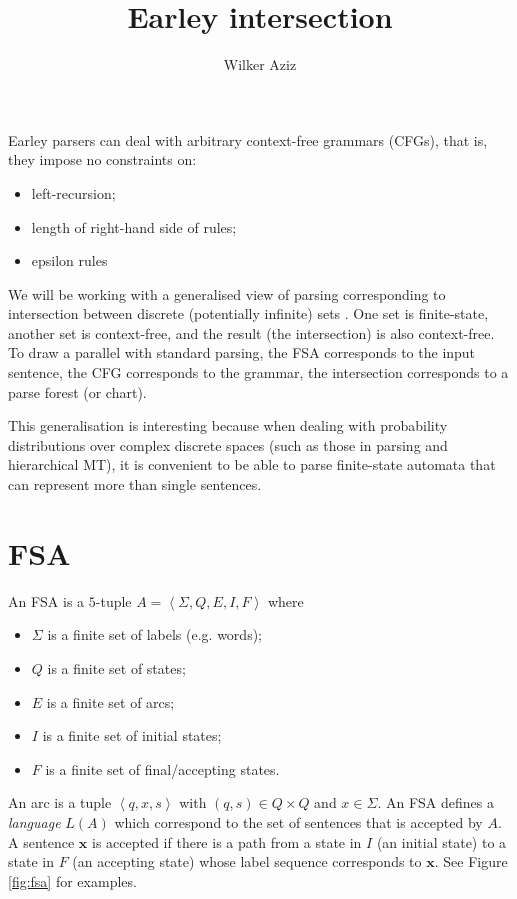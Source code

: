 \documentclass[11pt]{article}
\title{Earley intersection}
\author{Wilker Aziz}
\date{}
\newcommand{\angbrack}[1]{\ensuremath{\left\langle #1 \right\rangle}}
\begin{document}
\maketitle


Earley parsers \citep{Earley:1970} can deal with arbitrary context-free grammars (CFGs), that is, they impose no constraints on:
\begin{itemize}
	\item left-recursion;
	\item length of right-hand side of rules;
	\item epsilon rules
\end{itemize}

We will be working with a generalised view of parsing corresponding to intersection between discrete (potentially infinite) sets \citep{BarHillel+1961,Billott+1989}. One set is finite-state, another set is context-free, and the result (the intersection) is also context-free. 
To draw a parallel with standard parsing, the FSA corresponds to the input sentence, the CFG corresponds to the grammar, the intersection corresponds to a parse forest (or chart).

This generalisation is interesting because when dealing with probability distributions over complex discrete spaces (such as those in parsing and hierarchical MT), it is convenient to be able to parse finite-state automata that can represent more than single sentences.

\section{FSA} 

An FSA is a $5$-tuple $A = \angbrack{\Sigma, Q, E, I, F}$ where
\begin{itemize}
	\item $\Sigma$ is a finite set of labels (e.g. words);
	\item $Q$ is a finite set of states;
	\item $E$ is a finite set of arcs;
	\item $I$ is a finite set of initial states;
	\item $F$ is a finite set of final/accepting states.
\end{itemize}
An arc is a tuple $\angbrack{q, x, s}$ with $(q, s) \in Q \times Q$ and $x \in \Sigma$.
An FSA defines a \emph{language} $L(A)$ which correspond to the set of sentences that is accepted by $A$.
A sentence $\mathbf x$ is accepted if there is a path from a state in $I$ (an initial state) to a state in $F$ (an accepting state) whose label sequence corresponds to $\mathbf x$. See Figure \ref{fig:fsa} for examples.
\end{document}
